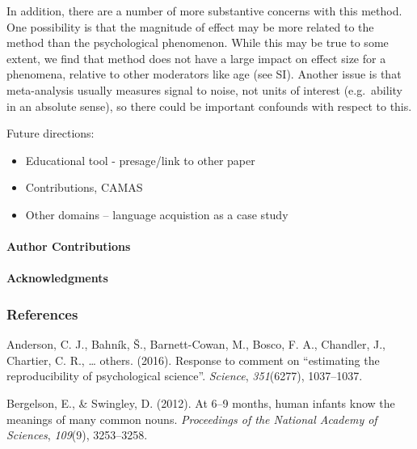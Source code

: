 \documentclass[english,floatsintext,man]{apa6}
\newcounter{author}
\begin{document}
In addition, there are a number of more substantive concerns with this
method. One possibility is that the magnitude of effect may be more
related to the method than the psychological phenomenon. While this may
be true to some extent, we find that method does not have a large impact
on effect size for a phenomena, relative to other moderators like age
(see SI). Another issue is that meta-analysis usually measures signal to
noise, not units of interest (e.g.~ability in an absolute sense), so
there could be important confounds with respect to this.

Future directions:

\begin{itemize}
\item
  Educational tool - presage/link to other paper
\item
  Contributions, CAMAS
\item
  Other domains -- language acquistion as a case study
\end{itemize}

\paragraph{Author Contributions}\label{author-contributions}

\paragraph{Acknowledgments}\label{acknowledgments}

\newpage

\subsubsection{References}\label{references}

\setlength{\parindent}{-0.5in} \setlength{\leftskip}{0.5in}
\setlength{\parskip}{8pt}

\hypertarget{refs}{}
\hypertarget{ref-anderson2016response}{}
Anderson, C. J., Bahník, Š., Barnett-Cowan, M., Bosco, F. A., Chandler,
J., Chartier, C. R., \ldots{} others. (2016). Response to comment on
``estimating the reproducibility of psychological science''.
\emph{Science}, \emph{351}(6277), 1037--1037.

\hypertarget{ref-bergelson2016}{}
Bergelson, E., \& Swingley, D. (2012). At 6--9 months, human infants
know the meanings of many common nouns. \emph{Proceedings of the
National Academy of Sciences}, \emph{109}(9), 3253--3258.
\end{document}
